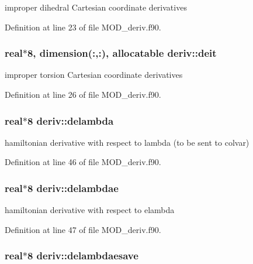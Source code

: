 improper dihedral Cartesian coordinate derivatives 



Definition at line 23 of file M\-O\-D\-\_\-deriv.\-f90.

\hypertarget{classderiv_a8fe01550c44dc68a07ef1be166c5f10e}{
\subsubsection[{deit}]{\setlength{\rightskip}{0pt plus 5cm}real$\ast$8, dimension(\-:,\-:), allocatable deriv\-::deit}}\label{classderiv_a8fe01550c44dc68a07ef1be166c5f10e}


improper torsion Cartesian coordinate derivatives 



Definition at line 26 of file M\-O\-D\-\_\-deriv.\-f90.

\hypertarget{classderiv_a3b2dad59531deb6bf5982e8a48e970c7}{
\subsubsection[{delambda}]{\setlength{\rightskip}{0pt plus 5cm}real$\ast$8 deriv\-::delambda}}\label{classderiv_a3b2dad59531deb6bf5982e8a48e970c7}


hamiltonian derivative with respect to lambda (to be sent to colvar) 



Definition at line 46 of file M\-O\-D\-\_\-deriv.\-f90.

\hypertarget{classderiv_a492abed147ecbc1c1a0714b6de99d570}{
\subsubsection[{delambdae}]{\setlength{\rightskip}{0pt plus 5cm}real$\ast$8 deriv\-::delambdae}}\label{classderiv_a492abed147ecbc1c1a0714b6de99d570}


hamiltonian derivative with respect to elambda 



Definition at line 47 of file M\-O\-D\-\_\-deriv.\-f90.

\hypertarget{classderiv_aa0f0b04326cf8dd8725cee1829c52340}{
\subsubsection[{delambdaesave}]{\setlength{\rightskip}{0pt plus 5cm}real$\ast$8 deriv\-::delambdaesave}}\label{classderiv_aa0f0b04326cf8dd8725cee1829c52340}


